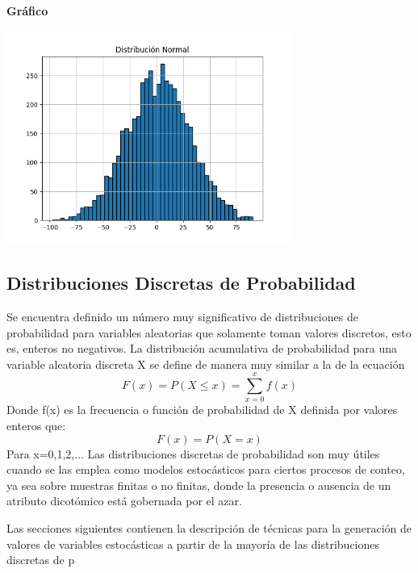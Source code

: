 \documentclass[11pt]{article}
\begin{document}
\noindent\textbf{Gráfico}\\

\begin{center}
\includegraphics[width=0.7\textwidth]{Images/histograma_normal.png}
\end{center}


\subsection{Distribuciones Discretas de Probabilidad}
Se encuentra definido un número muy significativo de distribuciones de probabilidad para variables aleatorias que solamente toman valores discretos, esto es, enteros no negativos. La distribución acumulativa de probabilidad para una variable aleatoria discreta X se define de manera muy similar a la de la ecuación
\begin{equation}
F(x) = P(X \leq x) = \sum_{x=0}^{x}f(x)
\end{equation}
Donde f(x) es la frecuencia o función de probabilidad de X definida por valores enteros que:
\begin{equation}
F(x) = P(X= x)
\end{equation}
Para x=0,1,2,...
Las distribuciones discretas de probabilidad son muy útiles cuando se las emplea como modelos estocásticos para ciertos procesos de conteo, ya sea sobre muestras finitas o no finitas, donde la presencia o ausencia de un atributo dicotómico está gobernada por el azar.

Las secciones siguientes contienen la descripción de técnicas para la generación de valores de variables estocásticas a partir de la mayoría de las distribuciones discretas de p
\end{document}
